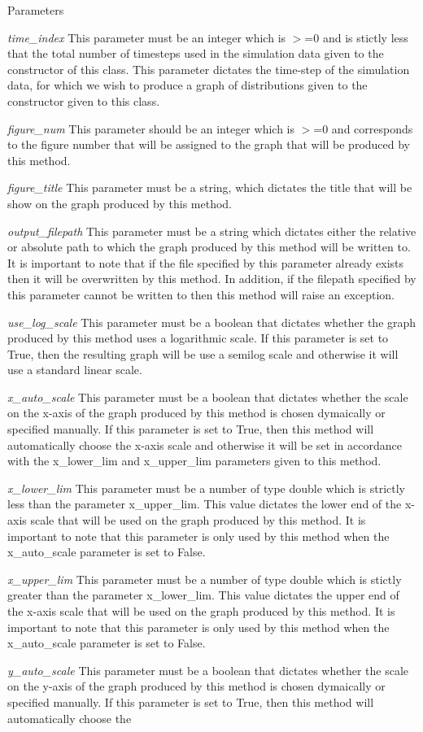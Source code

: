 \begin{DoxyParams}{Parameters}
\item[{\em time\_\-index}]This parameter must be an integer which is $>$=0 and is stictly less that the total number of timesteps used in the simulation data given to the constructor of this class. This parameter dictates the time-\/step of the simulation data, for which we wish to produce a graph of distributions given to the constructor given to this class. \item[{\em figure\_\-num}]This parameter should be an integer which is $>$=0 and corresponds to the figure number that will be assigned to the graph that will be produced by this method. \item[{\em figure\_\-title}]This parameter must be a string, which dictates the title that will be show on the graph produced by this method. \item[{\em output\_\-filepath}]This parameter must be a string which dictates either the relative or absolute path to which the graph produced by this method will be written to. It is important to note that if the file specified by this parameter already exists then it will be overwritten by this method. In addition, if the filepath specified by this parameter cannot be written to then this method will raise an exception. \item[{\em use\_\-log\_\-scale}]This parameter must be a boolean that dictates whether the graph produced by this method uses a logarithmic scale. If this parameter is set to True, then the resulting graph will be use a semilog scale and otherwise it will use a standard linear scale. \item[{\em x\_\-auto\_\-scale}]This parameter must be a boolean that dictates whether the scale on the x-\/axis of the graph produced by this method is chosen dymaically or specified manually. If this parameter is set to True, then this method will automatically choose the x-\/axis scale and otherwise it will be set in accordance with the x\_\-lower\_\-lim and x\_\-upper\_\-lim parameters given to this method. \item[{\em x\_\-lower\_\-lim}]This parameter must be a number of type double which is strictly less than the parameter x\_\-upper\_\-lim. This value dictates the lower end of the x-\/axis scale that will be used on the graph produced by this method. It is important to note that this parameter is only used by this method when the x\_\-auto\_\-scale parameter is set to False. \item[{\em x\_\-upper\_\-lim}]This parameter must be a number of type double which is stictly greater than the parameter x\_\-lower\_\-lim. This value dictates the upper end of the x-\/axis scale that will be used on the graph produced by this method. It is important to note that this parameter is only used by this method when the x\_\-auto\_\-scale parameter is set to False. \item[{\em y\_\-auto\_\-scale}]This parameter must be a boolean that dictates whether the scale on the y-\/axis of the graph produced by this method is chosen dymaically or specified manually. If this parameter is set to True, then this method will automatically choose the 
\end{DoxyParams}
